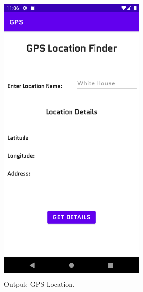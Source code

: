 \documentclass[12pt, a4]{article}
\begin{document}
\subsection*{}
\begin{figure}[h]
\centering
\caption{Output: GPS Location.}
\includegraphics[height=15cm, width=7.3cm]{GPS/Screenshots/Output-1.png}
\end{figure}

\newpage
\end{document}
